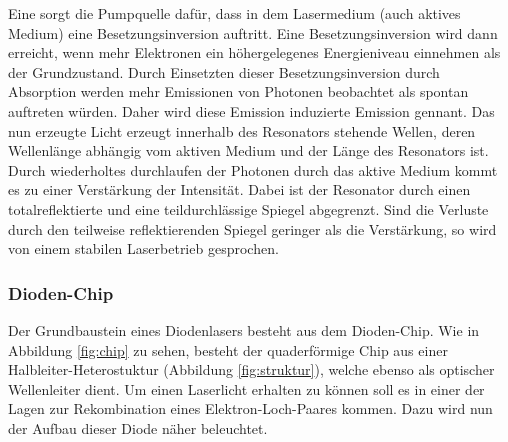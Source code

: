 Eine sorgt die Pumpquelle dafür, dass in dem Lasermedium (auch aktives Medium)
eine Besetzungsinversion auftritt. Eine Besetzungsinversion wird dann erreicht,
wenn mehr Elektronen ein höhergelegenes Energieniveau einnehmen als der
Grundzustand. Durch Einsetzten dieser Besetzungsinversion durch Absorption werden
mehr Emissionen von Photonen beobachtet als spontan auftreten würden. Daher wird
diese Emission induzierte Emission gennant. Das nun erzeugte Licht erzeugt innerhalb
des Resonators stehende Wellen, deren Wellenlänge abhängig vom aktiven Medium und
der Länge des Resonators ist. Durch wiederholtes durchlaufen der Photonen durch
das aktive Medium kommt es zu einer Verstärkung der Intensität. Dabei ist der
Resonator durch einen totalreflektierte
und eine teildurchlässige Spiegel abgegrenzt. Sind die Verluste durch den teilweise
reflektierenden Spiegel geringer als die Verstärkung, so wird von einem stabilen
Laserbetrieb gesprochen.


\subsubsection{Dioden-Chip}
Der Grundbaustein eines Diodenlasers besteht aus dem Dioden-Chip. Wie in
Abbildung \ref{fig:chip} zu sehen, besteht der quaderförmige Chip aus einer
Halbleiter-Heterostuktur (Abbildung \ref{fig:struktur}), welche ebenso als
optischer Wellenleiter dient. Um
einen Laserlicht erhalten zu können soll es in einer der Lagen zur Rekombination
eines Elektron-Loch-Paares kommen. Dazu wird nun der Aufbau dieser Diode näher
beleuchtet.

